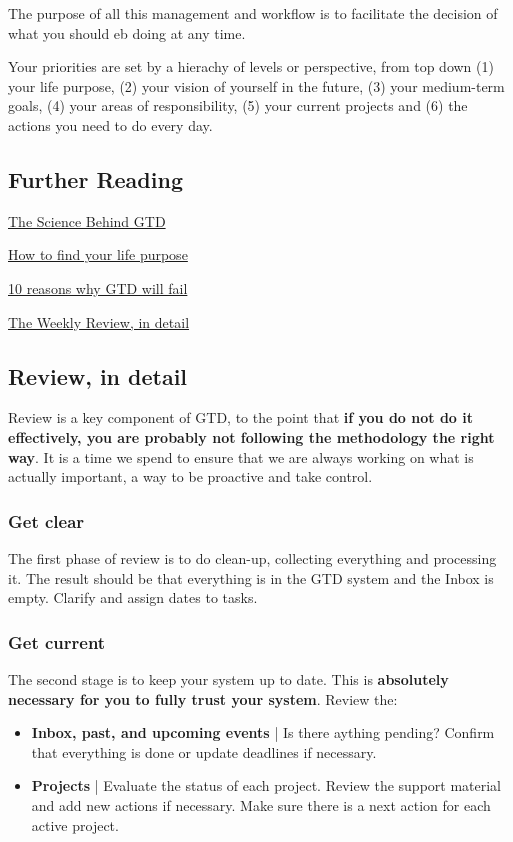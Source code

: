 The purpose of all this management and workflow is to facilitate the decision of what you should eb doing at any time.

Your priorities are set by a hierachy of levels or perspective, from top down (1) your life purpose, (2) your vision of yourself in the future, (3) your medium-term goals, (4) your areas of responsibility, (5) your current projects and (6) the actions you need to do every day.

\subsection{Further Reading}

\href{https://facilethings.com/blog/en/science}{The Science Behind GTD}

\href{https://facilethings.com/blog/en/life-purpose}{How to find your life purpose}

\href{https://facilethings.com/blog/en/why-gtd-fails}{10 reasons why GTD will fail}

\href{https://facilethings.com/blog/en/weekly-review}{The Weekly Review, in detail}

\subsection{Review, in detail}

Review is a key component of GTD, to the point that \textbf{if you do not do it effectively, you are probably not following the methodology the right way}. It is a time we spend to ensure that we are always working on what is actually important, a way to be proactive and take control.

\subsubsection*{Get clear}

The first phase of review is to do clean-up, collecting everything and processing it. The result should be that everything is in the GTD system and the Inbox is empty. Clarify and assign dates to tasks.

\subsubsection*{Get current}

The second stage is to keep your system up to date. This is \textbf{absolutely necessary for you to fully trust your system}. Review the:
\begin{itemize}
\item
	\textbf{Inbox, past, and upcoming events} | Is there aything pending? Confirm that everything is done or update deadlines if necessary.
\item
	\textbf{Projects} | Evaluate the status of each project. Review the support material and add new actions if necessary. Make sure there is a next action for each active project.
\end{itemize}

